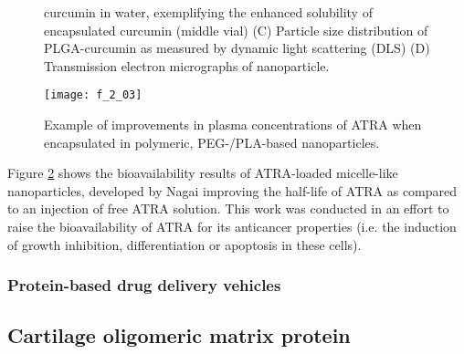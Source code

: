 \begin{refsection}
\begin{figure}[h!]
{    curcumin in water, exemplifying the enhanced solubility of encapsulated
    curcumin (middle vial) (C) Particle size distribution of PLGA-curcumin as
    measured by dynamic light scattering (DLS) (D) Transmission electron
    micrographs of nanoparticle.\cite{Yallapu2010b}}
    \label{fig:PLA_curcumin_example} \end{figure}
\begin{figure}[h!] \centering \texttt{[image: f\_2\_03]}
    \caption[Example of improvements in plasma concentrations of ATRA when
    encapsulated in polymeric, PEG-/PLA-based nanoparticles.]{Example of improvements in plasma concentrations of ATRA when
    encapsulated in polymeric, PEG-/PLA-based
    nanoparticles.\cite{Li2009}}\label{fig:PLA_ATRA_example} \end{figure}
Figure \ref{fig:PLA_ATRA_example} shows the bioavailability results of
ATRA-loaded micelle-like nanoparticles, developed by Nagai  improving the half-life of ATRA as compared to an injection of
free ATRA solution.\cite{Li2009} This work was conducted in an effort to raise
the bioavailability of ATRA for its anticancer properties (i.e. the induction of
growth inhibition, differentiation or apoptosis in these cells).\cite{Fang2002}

\subsubsection{Protein-based drug delivery vehicles}

\subsection{Cartilage oligomeric matrix protein}


\end{refsection}
